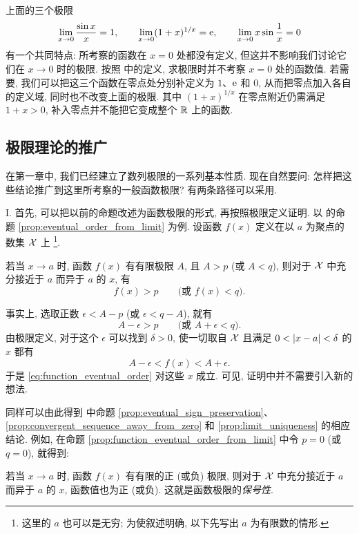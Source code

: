 \begin{remark}
上面的三个极限
$$
\lim_{x\to0}\frac{\sin x}{x}=1,\qquad
\lim_{x\to0}(1+x)^{1/x}=\mathrm{e},\qquad
\lim_{x\to0}x\sin\frac1x=0
$$
有一个共同特点: 所考察的函数在 $x=0$ 处都没有定义,
但这并不影响我们讨论它们在 $x\to0$ 时的极限.
按照  中的定义, 求极限时并不考察 $x=0$ 处的函数值.
若需要, 我们可以把这三个函数在零点处分别补定义为 $1$、$\mathrm{e}$ 和 $0$,
从而把零点加入各自的定义域, 同时也不改变上面的极限.
其中 $(1+x)^{1/x}$ 在零点附近仍需满足 $1+x>0$,
补入零点并不能把它变成整个 $\mathbb{R}$ 上的函数.
\end{remark}

\subsection{极限理论的推广}\label{subsec:55}
在第一章中, 我们已经建立了数列极限的一系列基本性质.
现在自然要问: 怎样把这些结论推广到这里所考察的一般函数极限?
有两条路径可以采用.

I. 首先, 可以把以前的命题改述为函数极限的形式, 再按照极限定义证明.
以  的命题 \ref{prop:eventual_order_from_limit} 为例.
设函数 $f(x)$ 定义在以 $a$ 为聚点的数集 $\mathcal{X}$ 上
\footnote{这里的 $a$ 也可以是无穷; 为使叙述明确, 以下先写出 $a$ 为有限数的情形.}.

\myrefparagraph{1\textdegree}\label{prop:function_eventual_order_from_limit}
{\kaishu 若当 $x\to a$ 时, 函数 $f(x)$ 有有限极限 $A$,
且 $A>p$ (或 $A<q$), 则对于 $\mathcal{X}$ 中充分接近于 $a$ 而异于 $a$ 的 $x$, 有
\begin{equation}\label{eq:function_eventual_order}
f(x)>p\qquad\text{(或 }f(x)<q\text{)}.
\end{equation}}

事实上, 选取正数 $\epsilon<A-p$ (或 $\epsilon<q-A$), 就有
$$
A-\epsilon>p\qquad\text{(或 }A+\epsilon<q\text{)}.
$$
由极限定义, 对于这个 $\epsilon$ 可以找到 $\delta>0$,
使一切取自 $\mathcal{X}$ 且满足 $0<\left| x-a \right|<\delta$ 的 $x$ 都有
$$
A-\epsilon<f(x)<A+\epsilon.
$$
于是 \eqref{eq:function_eventual_order} 对这些 $x$ 成立.
可见, 证明中并不需要引入新的想法.

同样可以由此得到  中命题
\ref{prop:eventual_sign_preservation}、\ref{prop:convergent_sequence_away_from_zero}
和 \ref{prop:limit_uniqueness} 的相应结论.
例如, 在命题 \ref{prop:function_eventual_order_from_limit} 中令 $p=0$ (或 $q=0$), 就得到:

\myrefparagraph{2\textdegree}\label{prop:function_eventual_sign_preservation}
{\kaishu 若当 $x\to a$ 时, 函数 $f(x)$ 有有限的正 (或负) 极限,
则对于 $\mathcal{X}$ 中充分接近于 $a$ 而异于 $a$ 的 $x$, 函数值也为正 (或负).}
这就是函数极限的\emph{保号性}.

